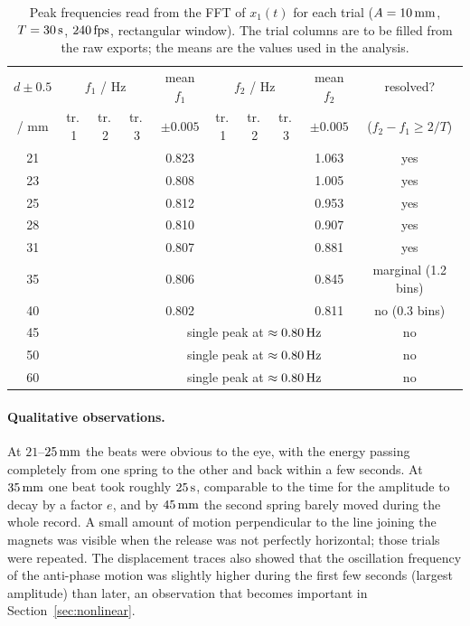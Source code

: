 \begin{table}[htbp]
\centering\footnotesize
\caption{Peak frequencies read from the FFT of $x_1(t)$ for each trial ($A=10\,\mathrm{mm}$, $T=30\,\mathrm{s}$, $240\,\mathrm{fps}$, rectangular window). The trial columns are to be filled from the raw exports; the means are the values used in the analysis.}
\label{tab:rawfreq}
\setlength{\tabcolsep}{3.5pt}
\begin{tabular}{@{}c ccc c ccc c c@{}}
\toprule
$d\pm0.5$ & \multicolumn{3}{c}{$f_1$ / Hz} & mean $f_1$ & \multicolumn{3}{c}{$f_2$ / Hz} & mean $f_2$ & resolved?\\
/ mm & tr.\,1 & tr.\,2 & tr.\,3 & $\pm0.005$ & tr.\,1 & tr.\,2 & tr.\,3 & $\pm0.005$ & ($f_2-f_1\geq2/T$)\\
\midrule
21 & \TBM{} & \TBM{} & \TBM{} & 0.823 & \TBM{} & \TBM{} & \TBM{} & 1.063 & yes\\
23 & & & & 0.808 & & & & 1.005 & yes\\
25 & & & & 0.812 & & & & 0.953 & yes\\
28 & & & & 0.810 & & & & 0.907 & yes\\
31 & & & & 0.807 & & & & 0.881 & yes\\
35 & & & & 0.806 & & & & 0.845 & marginal (1.2 bins)\\
40 & & & & 0.802 & & & & 0.811 & no (0.3 bins)\\
45 & & & & \multicolumn{5}{c}{single peak at $\approx0.80\,\mathrm{Hz}$} & no\\
50 & & & & \multicolumn{5}{c}{single peak at $\approx0.80\,\mathrm{Hz}$} & no\\
60 & & & & \multicolumn{5}{c}{single peak at $\approx0.80\,\mathrm{Hz}$} & no\\
\bottomrule
\end{tabular}
\end{table}

\paragraph{Qualitative observations.} At $21$--$25\,\mathrm{mm}$ the beats were obvious to the eye, with the energy passing completely from one spring to the other and back within a few seconds. At $35\,\mathrm{mm}$ one beat took roughly $25\,\mathrm{s}$, comparable to the time for the amplitude to decay by a factor $e$, and by $45\,\mathrm{mm}$ the second spring barely moved during the whole record. A small amount of motion perpendicular to the line joining the magnets was visible when the release was not perfectly horizontal; those trials were repeated. The displacement traces also showed that the oscillation frequency of the anti-phase motion was slightly higher during the first few seconds (largest amplitude) than later, an observation that becomes important in Section~\ref{sec:nonlinear}.
